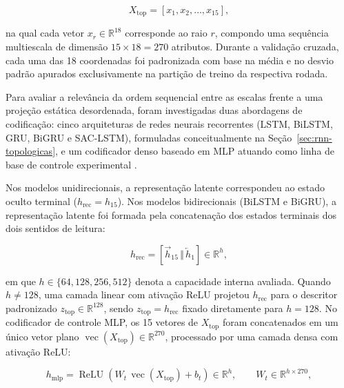 \begin{equation}
X_{\mathrm{top}} = [x_1, x_2, \ldots, x_{15}],
\label{eq:met-sequencia-topologica}
\end{equation}

na qual cada vetor $x_r \in \mathbb{R}^{18}$ corresponde ao raio $r$, compondo uma sequência multiescala de dimensão $15 \times 18 = 270$ atributos. Durante a validação cruzada, cada uma das 18 coordenadas foi padronizada com base na média e no desvio padrão apurados exclusivamente na partição de treino da respectiva rodada.

Para avaliar a relevância da ordem sequencial entre as escalas frente a uma projeção estática desordenada, foram investigadas duas abordagens de codificação: cinco arquiteturas de redes neurais recorrentes (LSTM, BiLSTM, GRU, BiGRU e SAC-LSTM), formuladas conceitualmente na Seção~\ref{sec:rnn-topologicas}, e um codificador denso baseado em MLP atuando como linha de base de controle experimental \cite{huang2022fusing,rumelhart1986learning}.

Nos modelos unidirecionais, a representação latente correspondeu ao estado oculto terminal ($h_{\mathrm{rec}} = h_{15}$). Nos modelos bidirecionais (BiLSTM e BiGRU), a representação latente foi formada pela concatenação dos estados terminais dos dois sentidos de leitura:

\begin{equation}
h_{\mathrm{rec}} = \left[\overrightarrow{h}_{15}\,\Vert\,\overleftarrow{h}_{1}\right] \in \mathbb{R}^{h},
\label{eq:met-embedding-topologico}
\end{equation}

em que $h \in \{64, 128, 256, 512\}$ denota a capacidade interna avaliada. Quando $h \neq 128$, uma camada linear com ativação ReLU projetou $h_{\mathrm{rec}}$ para o descritor padronizado $z_{\mathrm{top}} \in \mathbb{R}^{128}$, sendo $z_{\mathrm{top}} = h_{\mathrm{rec}}$ fixado diretamente para $h = 128$. No codificador de controle MLP, os 15 vetores de $X_{\mathrm{top}}$ foram concatenados em um único vetor plano $\operatorname{vec}(X_{\mathrm{top}}) \in \mathbb{R}^{270}$, processado por uma camada densa com ativação ReLU:

\begin{equation}
h_{\mathrm{mlp}} = \operatorname{ReLU}\left(W_{t}\,\operatorname{vec}(X_{\mathrm{top}}) + b_{t}\right) \in \mathbb{R}^{h}, \qquad W_{t} \in \mathbb{R}^{h \times 270},
\label{eq:met-embedding-topologico-mlp}
\end{equation}

